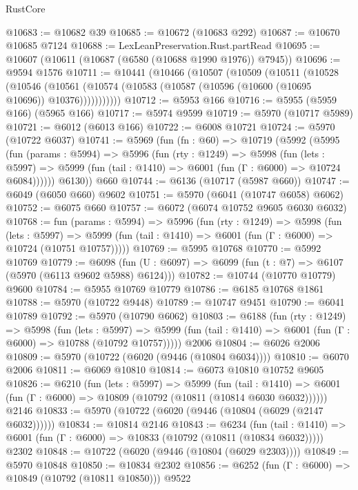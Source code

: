 \begin{lexlean}{RustCore}
\begin{coremodule}
@10683 := @10682 @39
@10685 := @10672 (@10683 @292)
@10687 := @10670 @10685 @7124
@10688 := LexLeanPreservation.Rust.partRead
@10695 := @10607 (@10611 (@10687 (@6580 (@10688 @1990 @1976)) @7945))
@10696 := @9594 @1576
@10711 := @10441
    (@10466
      (@10507
        (@10509
          (@10511
            (@10528
              (@10546
                (@10561 (@10574 (@10583 (@10587 (@10596 (@10600 (@10695 @10696)) @10376)))))))))))
@10712 := @5953 @166
@10716 := @5955 (@5959 @166) (@5965 @166)
@10717 := @5974 @9599
@10719 := @5970 (@10717 @5989)
@10721 := @6012 (@6013 @166)
@10722 := @6008 @10721
@10724 := @5970 (@10722 @6037)
@10741 := @5969
    (fun (fn : @60) =>
    @10719
      (@5992
        (@5995
          (fun (params : @5994) =>
          @5996
            (fun (rty : @1249) =>
            @5998
              (fun (lets : @5997) =>
              @5999 (fun (tail : @1410) => @6001 (fun (Γ : @6000) => @10724 @6084))))))
        @6130))
    @660
@10744 := @6136 (@10717 (@5987 @660))
@10747 := @6049 (@6050 @660) @9602
@10751 := @5970 (@6041 (@10747 @6058) @6062)
@10752 := @6075 @660
@10757 := @6072 (@6074 @10752 @9605 @6030 @6032)
@10768 := fun (params : @5994) =>
  @5996
    (fun (rty : @1249) =>
    @5998
      (fun (lets : @5997) =>
      @5999 (fun (tail : @1410) => @6001 (fun (Γ : @6000) => @10724 (@10751 @10757)))))
@10769 := @5995 @10768
@10770 := @5992 @10769
@10779 := @6098 (fun (U : @6097) => @6099 (fun (t : @7) => @6107 (@5970 (@6113 @9602 @5988) @6124)))
@10782 := @10744 (@10770 @10779) @9600
@10784 := @5955 @10769 @10779
@10786 := @6185 @10768 @1861
@10788 := @5970 (@10722 @9448)
@10789 := @10747 @9451
@10790 := @6041 @10789
@10792 := @5970 (@10790 @6062)
@10803 := @6188
    (fun (rty : @1249) =>
    @5998
      (fun (lets : @5997) =>
      @5999 (fun (tail : @1410) => @6001 (fun (Γ : @6000) => @10788 (@10792 @10757)))))
    @2006
@10804 := @6026 @2006
@10809 := @5970 (@10722 (@6020 (@9446 (@10804 @6034))))
@10810 := @6070 @2006
@10811 := @6069 @10810
@10814 := @6073 @10810 @10752 @9605
@10826 := @6210
    (fun (lets : @5997) =>
    @5999
      (fun (tail : @1410) =>
      @6001 (fun (Γ : @6000) => @10809 (@10792 (@10811 (@10814 @6030 @6032))))))
    @2146
@10833 := @5970 (@10722 (@6020 (@9446 (@10804 (@6029 (@2147 @6032))))))
@10834 := @10814 @2146
@10843 := @6234
    (fun (tail : @1410) => @6001 (fun (Γ : @6000) => @10833 (@10792 (@10811 (@10834 @6032)))))
    @2302
@10848 := @10722 (@6020 (@9446 (@10804 (@6029 @2303))))
@10849 := @5970 @10848
@10850 := @10834 @2302
@10856 := @6252 (fun (Γ : @6000) => @10849 (@10792 (@10811 @10850))) @9522

\end{coremodule}
\end{lexlean}

